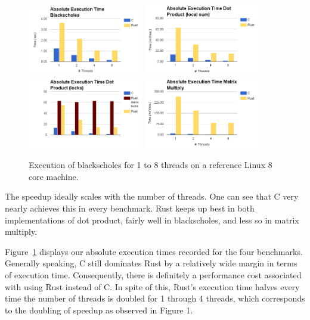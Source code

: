 \begin{figure}
\centering
\includegraphics[width=0.45\textwidth]{blackscholes_abs.png}
\includegraphics[width=0.45\textwidth]{dot_product_local_abs.png}
\includegraphics[width=0.45\textwidth]{dot_product_locks_abs.png}
\includegraphics[width=0.45\textwidth]{mm_abs.png}
\caption{Execution of blackscholes for 1 to 8 threads on a reference Linux 8 core machine.}
\label{fig:absolute_time}
\end{figure}

The speedup ideally scales with the number of threads. One can see that C very nearly achieves this in every benchmark. Rust keeps up best in both implementations of dot product, fairly well in blackscholes, and less so in matrix multiply.

Figure~\ref{fig:absolute_time} displays our absolute execution times recorded for the four benchmarks. Generally speaking, C still dominates Rust by a relatively wide margin in terms of execution time. Consequently, there is definitely a performance cost associated with using Rust instead of C. In spite of this, Rust's execution time halves every time the number of threads is doubled for 1 through 4 threads, which corresponds to the doubling of speedup as observed in Figure 1.

